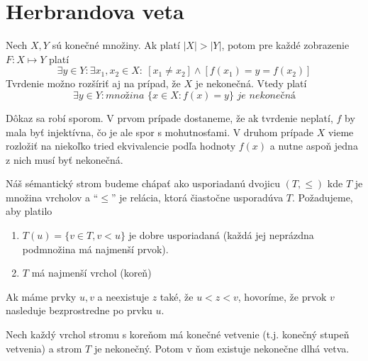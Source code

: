 \section{Herbrandova veta}

\begin{lema}
    Nech $X,Y$ sú konečné množiny. Ak platí
    $|X| > |Y|$, potom pre každé zobrazenie
    $F:X \mapsto Y$ platí
    \begin{equation*}
        \exists y \in Y:
            \exists x_1,x_2 \in X:\ 
                [x_1 \ne x_2] \land [f(x_1)=y=f(x_2)]
    \end{equation*}
    Tvrdenie možno rozšíriť aj na prípad, že $X$ je nekonečná.
    Vtedy platí
    \begin{equation*}
        \exists y\in Y:
            \textit{množina }\{ x\in X: f(x)=y \}
            \textit{ je nekonečná}
    \end{equation*}
\end{lema}
\begin{dokaz}
    Dôkaz sa robí sporom. V prvom prípade dostaneme, že ak tvrdenie
    neplatí, $f$ by mala byť injektívna, čo je ale spor s
    mohutnosťami. V druhom prípade $X$ vieme rozložiť na niekoľko
    tried ekvivalencie podľa hodnoty $f(x)$ a nutne aspoň jedna z nich
    musí byť nekonečná.
    \\
\end{dokaz}

\begin{definicia}
    Náš sémantický strom budeme chápať ako usporiadanú dvojicu 
    $(T,\le)$ kde $T$ je množina vrcholov a ``$\le$'' je relácia,
    ktorá čiastočne usporadúva $T$.
    Požadujeme, aby platilo

    \begin{enumerate}
	\item $T(u)=\{v\in T, v<u\}$ je dobre usporiadaná 
            (každá jej neprázdna podmnožina má najmenší prvok).

	\item $T$ má najmenší vrchol (koreň)
    \end{enumerate}

    Ak máme prvky $u,v$ a neexistuje $z$ také, že $u < z < v$,
    hovoríme, že prvok $v$ nasleduje bezprostredne po prvku $u$.
\end{definicia}

\begin{lema}[K\"onig] 
    Nech každý vrchol stromu s koreňom má konečné vetvenie
    (t.j. konečný stupeň vetvenia) a strom $T$ je nekonečný.
    Potom v ňom existuje nekonečne dlhá vetva.
\end{lema}

